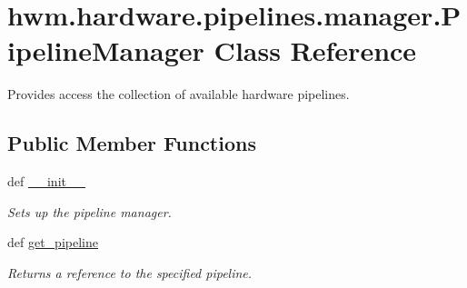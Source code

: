 \hypertarget{classhwm_1_1hardware_1_1pipelines_1_1manager_1_1_pipeline_manager}{\section{hwm.\-hardware.\-pipelines.\-manager.\-Pipeline\-Manager Class Reference}
\label{classhwm_1_1hardware_1_1pipelines_1_1manager_1_1_pipeline_manager}
}


Provides access the collection of available hardware pipelines.  


\subsection*{Public Member Functions}
\begin{DoxyCompactItemize}
\item 
def \hyperlink{classhwm_1_1hardware_1_1pipelines_1_1manager_1_1_pipeline_manager_a88a42b5d8f14bb37d5618cd29452126d}{\-\_\-\-\_\-init\-\_\-\-\_\-}
\begin{DoxyCompactList}\small\item\em Sets up the pipeline manager. \end{DoxyCompactList}\item 
def \hyperlink{classhwm_1_1hardware_1_1pipelines_1_1manager_1_1_pipeline_manager_acd2d1d93204110d7256c8cbb34cde804}{get\-\_\-pipeline}
\begin{DoxyCompactList}\small\item\em Returns a reference to the specified pipeline. \end{DoxyCompactList}\end{DoxyCompactItemize}
